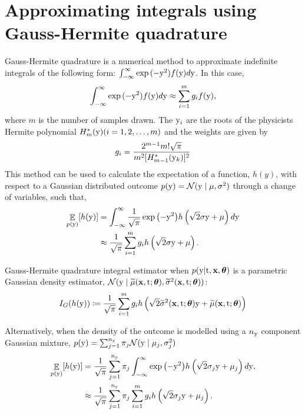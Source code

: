 \section{Approximating integrals using Gauss-Hermite quadrature}
\label{app:gauss-hermite}
Gauss-Hermite quadrature is a numerical method to approximate indefinite integrals of the following form: $\int_{-\infty}^{\infty}\exp{(-\mathrm{y}^2)f(\mathrm{y})d\mathrm{y}}$.
In this case,
\begin{equation*}
    \int_{-\infty}^{\infty}\exp{(-\mathrm{y}^2)f(\mathrm{y})d\mathrm{y}} \approx \sum_{i=1}^{m}g_i f(\mathrm{y}),
\end{equation*}
where $m$ is the number of samples drawn. The $\mathrm{y}_i$ are the roots of the physicists Hermite polynomial $H^*_{m}(\mathrm{y})(i=1, 2, \dots, m)$ and the weights are given by
\begin{equation*}
    g_i = \frac{2^{m-1}m!\sqrt{\pi}}{m^2[H^*_{m-1}(\mathrm{y}_k)]^2}
\end{equation*}
This method can be used to calculate the expectation of a function, $h(y)$, with respect to a Gaussian distributed outcome $p(\mathrm{y}) = \mathcal{N}(\mathrm{y} \mid \mu, \sigma^2)$ through a change of variables, such that,
\begin{equation}
    \label{eq:gauss-hermite}
    \begin{split}
        \mathop{\mathbb{E}}_{p(\mathrm{y})}[h(\mathrm{y})] &= \int_{-\infty}^{\infty} \frac{1}{\sqrt{\pi}}\exp{\left( -\mathrm{y}^2 \right)} h\left( \sqrt{2}\sigma \mathrm{y} + \mu \right) d\mathrm{y}   \\
        &\approx \frac{1}{\sqrt{\pi}} \sum_{i=1}^{m}g_i h\left( \sqrt{2}\sigma \mathrm{y} + \mu \right).
    \end{split}
\end{equation}
\begin{definition}
\label{def:gh-integral-estimator}
{\normalfont Gauss-Hermite quadrature integral estimator when $p(\mathrm{y} | \mathrm{t}, \mathbf{x}, \bm{\theta})$ is a parametric Gaussian density estimator, $\mathcal{N}(\mathrm{y} \mid \widetilde{\mu}(\mathbf{x}, \mathrm{t}; \bm{\theta}), \widetilde{\sigma}^{2}(\mathbf{x}, \mathrm{t}; \bm{\theta}))$}:
    \begin{equation*}
        I_{G}(h(\mathrm{y})) \coloneqq \frac{1}{\sqrt{\pi}} \sum_{i=1}^{m} g_i h\left( \sqrt{2}\widetilde{\sigma}^{2}(\mathbf{x}, \mathrm{t}; \bm{\theta}) \mathrm{y} + \widetilde{\mu}(\mathbf{x}, \mathrm{t}; \bm{\theta}) \right)
    \end{equation*}
\end{definition}
Alternatively, when the density of the outcome is modelled using a $n_{\mathrm{y}}$ component Gaussian mixture, $p(\mathrm{y}) = \sum_{j=1}^{n_{\mathrm{y}}} \pi_{j} \mathcal{N}(\mathrm{y} \mid \mu_j, \sigma_{j}^2)$
\begin{equation*}
    \label{eq:gauss-hermite-mix}
    \begin{split}
        \mathop{\mathbb{E}}_{p(\mathrm{y})}[h(\mathrm{y})]
        &= \frac{1}{\sqrt{\pi}} \sum_{j=1}^{n_{\mathrm{y}}} \pi_{j} \int_{-\infty}^{\infty} \exp{\left( -\mathrm{y}^2 \right)} h\left( \sqrt{2}\sigma_j \mathrm{y} + \mu_{j} \right) d\mathrm{y}, \\
        &\approx \frac{1}{\sqrt{\pi}} \sum_{j=1}^{n_{\mathrm{y}}} \pi_{j} \sum_{i=1}^{m}g_i h\left( \sqrt{2}\sigma_j \mathrm{y} + \mu_j \right).
    \end{split}
\end{equation*}
